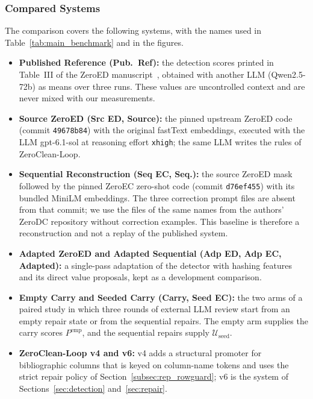 \documentclass[conference]{IEEEtran}
\begin{document}
\subsubsection{Compared Systems}
The comparison covers the following systems, with the names used in Table~\ref{tab:main_benchmark} and in the figures.
\begin{itemize}[leftmargin=*, itemsep=0pt, topsep=1pt]
\item \textbf{Published Reference (Pub.\ Ref):} the detection scores printed in Table~III of the ZeroED manuscript~\cite{ni2025zeroed}, obtained with another LLM (Qwen2.5-72b) as means over three runs. These values are uncontrolled context and are never mixed with our measurements.
\item \textbf{Source ZeroED (Src ED, Source):} the pinned upstream ZeroED code (commit \texttt{49678b84}) with the original fastText embeddings, executed with the LLM gpt-6.1-sol at reasoning effort \texttt{xhigh}; the same LLM writes the rules of ZeroClean-Loop.
\item \textbf{Sequential Reconstruction (Seq EC, Seq.):} the source ZeroED mask followed by the pinned ZeroEC zero-shot code (commit \texttt{d76ef455}) with its bundled MiniLM embeddings. The three correction prompt files are absent from that commit; we use the files of the same names from the authors' ZeroDC repository without correction examples. This baseline is therefore a reconstruction and not a replay of the published system.
\item \textbf{Adapted ZeroED and Adapted Sequential (Adp ED, Adp EC, Adapted):} a single-pass adaptation of the detector with hashing features and its direct value proposals, kept as a development comparison.
\item \textbf{Empty Carry and Seeded Carry (Carry, Seed EC):} the two arms of a paired study in which three rounds of external LLM review start from an empty repair state or from the sequential repairs. The empty arm supplies the carry scores $P^{\mathrm{emp}}$, and the sequential repairs supply $\mathcal{U}_{\mathrm{seed}}$.
\item \textbf{ZeroClean-Loop v4 and v6:} v4 adds a structural promoter for bibliographic columns that is keyed on column-name tokens and uses the strict repair policy of Section~\ref{subsec:rep_rowguard}; v6 is the system of Sections~\ref{sec:detection} and~\ref{sec:repair}.
\end{itemize}
\end{document}
